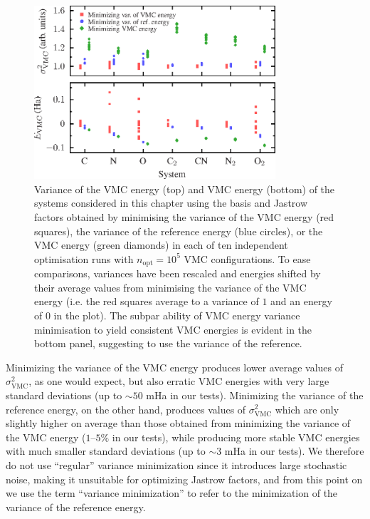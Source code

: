 \begin{figure}[htbp]
    \centering
    \includegraphics[width=0.8\textwidth]{figures/optimisation/Fig/varmin-E-Eref}
    \caption{Variance of the VMC energy (top) and VMC energy (bottom) of the systems considered in this chapter using the \vtz basis and Jastrow factors obtained by minimising the variance of the VMC energy (red squares), the variance of the reference energy (blue circles), or the VMC energy (green diamonds) in each of ten independent optimisation runs with $n_\mathrm{opt}=10^5$ VMC configurations. To ease comparisons, variances have been rescaled and energies shifted by their average values from minimising the variance of the VMC energy (i.e. the red squares average to a variance of $1$ and an energy of $0$ in the plot). The subpar ability of VMC energy variance minimisation to yield consistent VMC energies is evident in the bottom panel, suggesting to use the variance of the reference.}
    \label{fig:varmin-E-Eref}
\end{figure}
%
Minimizing the variance of the VMC energy produces lower average
values of $\sigma_\mathrm{VMC}^2$, as one would expect, but also erratic
VMC energies with very large standard deviations (up to $\sim50$ mHa
in our tests).
%
Minimizing the variance of the reference energy, on the other hand,
produces values of $\sigma_\mathrm{VMC}^2$ which are only slightly higher
on average than those obtained from minimizing the variance of the VMC
energy ($1$--$5\%$ in our tests), while producing more stable VMC
energies with much smaller standard deviations (up to $\sim3$ mHa in
our tests).
%
We therefore do not use ``regular'' variance minimization since it
introduces large stochastic noise, making it unsuitable for optimizing
Jastrow factors, and from this point on we use the term ``variance
minimization'' to refer to the minimization of the variance of the
reference energy.

